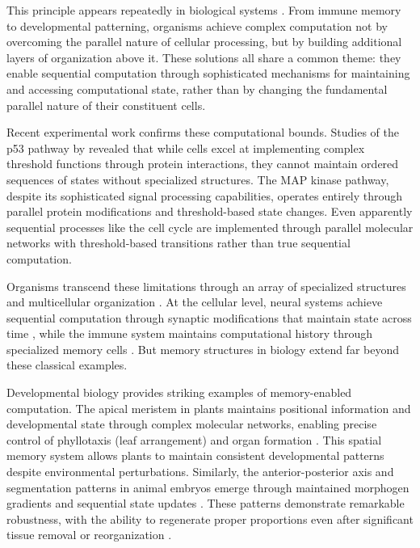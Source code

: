 \documentclass[12pt]{article}
\begin{document}
This principle appears repeatedly in biological systems \cite{fu2024memory}. From immune memory to developmental patterning, organisms achieve complex computation not by overcoming the parallel nature of cellular processing, but by building additional layers of organization above it. These solutions all share a common theme: they enable sequential computation through sophisticated mechanisms for maintaining and accessing computational state, rather than by changing the fundamental parallel nature of their constituent cells.

Recent experimental work confirms these computational bounds. Studies of the p53 pathway by \cite{batchelor2023dynamic} revealed that while cells excel at implementing complex threshold functions through protein interactions, they cannot maintain ordered sequences of states without specialized structures. The MAP kinase pathway, despite its sophisticated signal processing capabilities, operates entirely through parallel protein modifications and threshold-based state changes. Even apparently sequential processes like the cell cycle are implemented through parallel molecular networks with threshold-based transitions rather than true sequential computation.

Organisms transcend these limitations through an array of specialized structures and multicellular organization \cite{espinosa2024molecular}. At the cellular level, neural systems achieve sequential computation through synaptic modifications that maintain state across time \cite{fu2024memory}, while the immune system maintains computational history through specialized memory cells \cite{niu2022computational}. But memory structures in biology extend far beyond these classical examples.

Developmental biology provides striking examples of memory-enabled computation. The apical meristem in plants maintains positional information and developmental state through complex molecular networks, enabling precise control of phyllotaxis (leaf arrangement) and organ formation \cite{lovkvist2021using}. This spatial memory system allows plants to maintain consistent developmental patterns despite environmental perturbations. Similarly, the anterior-posterior axis and segmentation patterns in animal embryos emerge through maintained morphogen gradients and sequential state updates \cite{pastor2020computation}. These patterns demonstrate remarkable robustness, with the ability to regenerate proper proportions even after significant tissue removal or reorganization \cite{lobo2012towards}.
\end{document}
